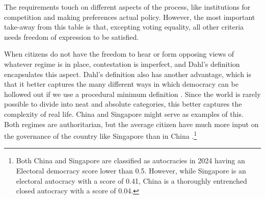 The requirements touch on different aspects of the process, like institutions for competition and making preferences actual policy. However, the most important take-away from this table is that, excepting voting equality, all other criteria needs freedom of expression to be satisfied.

When citizens do not have the freedom to hear or form opposing views of whatever regime is in place, contestation is imperfect, and Dahl's definition encapsulates this aspect. Dahl's definition also has another advantage, which is that it better captures the many different ways in which democracy can be hollowed out if we use a procedural minimum definition \citep{varol_stealth_2015}. Since the world is rarely possible to divide into neat and absolute categories, this better captures the complexity of real life. China and Singapore might serve as examples of this. Both regimes are authoritarian, but the average citizen have much more input on the governance of the country like Singapore than in China \citep[pp. 62-63]{nord_democracy_2025}.\footnote{Both China and Singapore are classified as autocracies in 2024 having an Electoral democracy score lower than 0.5. However,  while Singapore is an electoral autocracy \citep[p. 14]{nord_democracy_2025} with a score of 0.41, China is a thoroughly entrenched closed autocracy with a score of 0.04.\citep{nord_democracy_2025}} 

